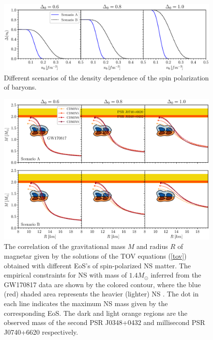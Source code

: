 \begin{figure}[ht!]
    \centering
    \includegraphics[width=\textwidth]{fig/Delta.eps}
    \caption{Different scenarios of the density dependence of the spin polarization 
		of baryons.}
    \label{fig:Delta}
\end{figure} 
\begin{figure}[ht!]
        \centering
        \includegraphics[width=\textwidth]{fig/MR.eps}
        \caption{The correlation of the gravitational mass $M$ and radius $R$ of magnetar 
            given by the solutions of the \gls{TOV} equations (\ref{tov}) obtained with different 
            EoS's of spin-polarized \gls{NS} matter. The empirical constraints for \gls{NS} with 
				mass of $1.4M_\odot$ inferred from the GW170817 data are shown by the colored contour,
				where the blue (red) shaded area represents the heavier (lighter) \gls{NS} 
				\citep{abbott2018gw170817}. The dot in each line indicates the maximum \gls{NS} 
				mass given by the corresponding EoS. The dark and light orange regions are the observed
				mass of the second \gls{PSR} J0348+0432 \citep{antoniadis2013massive} and 
				millisecond \gls{PSR} J0740+6620 \citep{cromartie2020relativistic} respectively.}
        \label{fig:mr}
\end{figure} 
